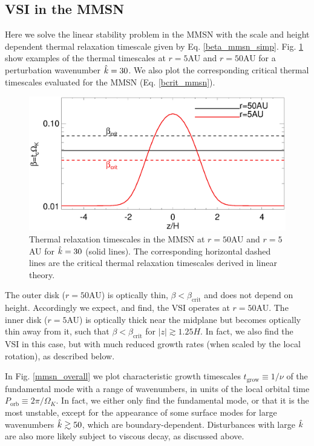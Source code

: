 \subsection{VSI in the MMSN}
Here we solve the linear stability problem in the MMSN with the scale and
height dependent thermal relaxation timescale given by
Eq. \ref{beta_mmsn_simp}.  Fig. \ref{beta_compare} show examples of
the thermal timescales at $r=5$AU and $r=50$AU for a
perturbation wavenumber $\hat{k}=30$. We also plot the 
corresponding critical thermal timescales evaluated for the MMSN
(Eq. \ref{bcrit_mmsn}).  
 \begin{figure}
  \includegraphics[width=\linewidth,clip=true,trim=0cm 0cm 0cm
  0cm]{figures/beta_compare}
  \caption{Thermal relaxation timescales in the MMSN at $r=50$AU
    and $r=5$AU for $\hat{k}=30$ (solid lines). The
    corresponding horizontal dashed lines are the critical thermal
    relaxation timescales derived in linear theory. 
    \label{beta_compare}}
\end{figure}

The outer disk ($r=50$AU) is optically thin,
$\beta<\beta_\mathrm{crit}$  and  does not depend on height.
Accordingly we expect, and find, the VSI operates at $r=50$AU. The
inner disk ($r=5$AU) is optically thick near the midplane but becomes
optically thin away from it, such that $\beta < \beta_\mathrm{crit}$
for $|z|\gtrsim1.25H$. In fact, we also find the VSI in this case, but
with much reduced growth rates (when scaled by the local rotation), as
described below.     

In Fig. \ref{mmsn_overall} we plot characteristic growth timescales
$t_\mathrm{grow} \equiv 1/\nu$ of the fundamental mode with a range of
wavenumbers, in units of the local orbital time $P_\mathrm{orb}\equiv
2\pi/\Omega_K$. In fact, we either only find the fundamental mode, or 
that it is the most unstable, except for the appearance of some 
surface modes for large wavenumbers $\hat{k}\gtrsim 50$, which are 
boundary-dependent.  
Disturbances with large $\hat{k}$ are also more likely subject to viscous 
decay, as discussed above. 


